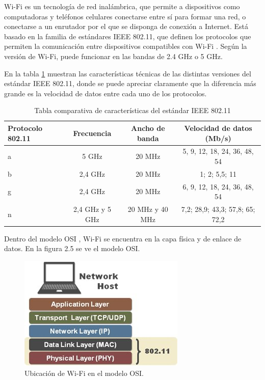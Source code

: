 Wi-Fi es un tecnología de red inalámbrica, que permite a dispositivos como computadoras y teléfonos celulares conectarse entre sí para formar una red, o conectarse a un enrutador por el que se disponga de conexión a Internet. Está basado en la familia de estándares IEEE 802.11, que definen los protocolos que permiten la comunicación entre dispositivos compatibles con Wi-Fi \citep{WEBSITE:11}. Según la versión de Wi-Fi, puede funcionar en las bandas de 2.4 GHz o 5 GHz\citep{WEBSITE:11}.

En la tabla \ref{tab:IEEE80211} muestran las características técnicas de las distintas versiones del estándar IEEE 802.11, donde se puede apreciar claramente que la diferencia más grande es la velocidad de datos entre cada uno de los protocolos.

\begin{table}[h]
	\centering
	\caption[IEEE 802.11]{Tabla comparativa de características del estándar IEEE 802.11\protect\footnotemark}
	\begin{tabular}{l c c c}    
		\toprule
		\textbf{Protocolo 802.11} & \textbf{Frecuencia} & \textbf{Ancho de banda} & \textbf{Velocidad de datos (Mb/s)} \\
		\midrule
		a & 5 GHz 			& 20 MHz 		  & 5, 9, 12, 18, 24, 36, 48, 54 \\		
		b & 2,4 GHz			& 20 MHz 		  & 1; 2; 5,5; 11 \\
		g & 2,4 GHz			& 20 MHz          & 6, 9, 12, 18, 24, 36, 48, 54 \\
		n & 2,4 GHz y 5 GHz & 20 MHz y 40 MHz & 7,2; 28,9; 43,3; 57,8; 65; 72,2 \\
		\bottomrule
		\hline
	\end{tabular}
	\label{tab:IEEE80211}
\end{table}


Dentro del modelo OSI \citep{WEBSITE:15}, Wi-Fi se encuentra en la capa física y de enlace de datos. En la figura 2.5 se ve el modelo OSI.
\begin{figure}[h]
	\centering
	\includegraphics[scale=0.7]{./Figures/osi_model.jpg}
	\caption{Ubicación de Wi-Fi en el modelo OSI\protect\footnotemark.}
	\label{fig:cuadradoAzul}
\end{figure}

